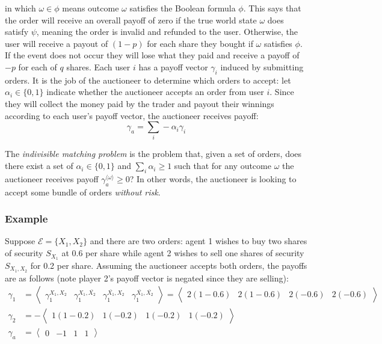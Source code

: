 in which $\omega \in \phi$ means outcome $\omega$ satisfies the Boolean formula
$\phi$. This says that the order will receive an overall payoff of zero if the
true world state $\omega$ does satisfy $\psi$, meaning the order is invalid and
refunded to the user. Otherwise, the user will receive a payout of $(1-p)$ for
each share they bought if $\omega$ satisfies $\phi$. If the event does not
occur they will lose what they paid and receive a payoff of $-p$ for each of
$q$ shares. Each user $i$ has a payoff vector $\gamma_i$ induced by submitting
orders. It is the job of the auctioneer to determine which orders to accept:
let $\alpha_i \in \{0,1\}$ indicate whether the auctioneer accepts an order
from user $i$. Since they will collect the money paid by the trader and payout
their winnings according to each user's payoff vector, the auctioneer receives
payoff: $$ \gamma_a = \sum_i -\alpha_i \gamma_i $$

The \emph{indivisible matching problem} is the problem that, given a set of
orders, does there exist a set of $\alpha_i \in \{0,1\}$ and $\sum_i \alpha_i
\ge 1$ such that for any outcome $\omega$ the auctioneer receives payoff
$\gamma_a^{\langle \omega \rangle} \ge 0$? In other words, the auctioneer is
looking to accept some bundle of orders \emph{without risk}.

\subsubsection*{Example}

Suppose $\mathcal{E} = \{X_1, X_2\}$ and there are two orders: agent 1 wishes
to buy two shares of security $S_{X_1}$ at 0.6 per share while agent 2 wishes
to sell one shares of security $S_{X_1,X_2}$ for 0.2 per share. Assuming the
auctioneer accepts both orders, the payoffs are as follows (note player 2's
payoff vector is negated since they are selling):
%
\begin{equation*}
	\begin{aligned}
		\gamma_1 & = \left\langle \begin{matrix}
			\gamma_1^{X_1,X_2} &
			\gamma_1^{X_1,\bar{X_2}} &
			\gamma_1^{\bar{X_1},X_2} &
		\gamma_1^{\bar{X_1},\bar{X_2}} \end{matrix} \right\rangle 
%
		 = \left\langle \begin{matrix}
			2(1-0.6) & 2(1-0.6) & 2(-0.6) & 2(-0.6) \end{matrix} \right\rangle \\
%
		\gamma_2 & = - \left\langle \begin{matrix}
			1(1-0.2) & 1(-0.2) & 1(-0.2) & 1(-0.2) \end{matrix} \right\rangle \\
%
		\gamma_a & = \left\langle \begin{matrix}
			0 & -1 & 1 & 1 \end{matrix} \right\rangle
	\end{aligned}
\end{equation*}

